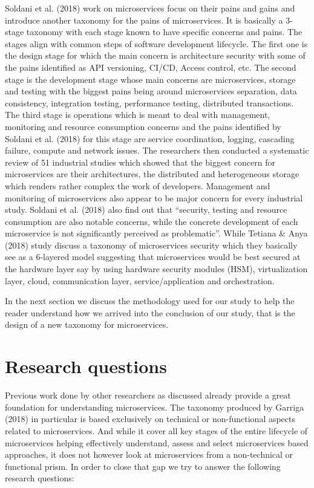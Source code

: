 \documentclass{article}
\begin{document}
Soldani et al. (2018) work on microservices focus on their pains and gains and introduce another taxonomy for the pains of microservices. It is basically a 3-stage taxonomy with each stage known to have specific concerns and pains. The stages align with common steps of software development lifecycle. The first one is the design stage for which the main concern is architecture security with some of the pains identified as API versioning, CI/CD, Access control, etc. The second stage is the development stage whose main concerns are microservices, storage and testing with the biggest pains being around microservices separation, data consistency, integration testing, performance testing, distributed transactions. The third stage is operations which is meant to deal with management, monitoring and resource consumption concerns and the pains identified by Soldani et al. (2018) for this stage are service coordination, logging, cascading failure, compute and network issues. The researchers then conducted a systematic review of 51 industrial studies which showed that the biggest concern for microservices are their architectures, the distributed and heterogeneous storage which renders rather complex the work of developers. Management and monitoring of microservices also appear to be major concern for every industrial study. Soldani et al. (2018) also find out that “security, testing and resource consumption are also notable concerns, while the concrete development of each microservice is not significantly perceived as problematic”. While Tetiana \& Anya (2018) study discuss a taxonomy of microservices security which they basically see as a 6-layered model suggesting that microservices would be best secured at the hardware layer say by using hardware security modules (HSM), virtualization layer, cloud, communication layer, service/application and orchestration.


In the next section we discuss the methodology used for our study to help the reader understand how we arrived into the conclusion of our study, that is the design of a new taxonomy for microservices.

\section{Research questions}

Previous work done by other researchers as discussed already provide a great foundation for understanding microservices. The taxonomy produced by Garriga (2018) in particular is based exclusively on technical or non-functional aspects related to microservices. And while it cover all key stages of the entire lifecycle of microservices helping effectively understand, assess and select microservices based approaches, it does not however look at microservices from a non-technical or functional prism. In order to close that gap we try to answer the following research questions:
\end{document}
